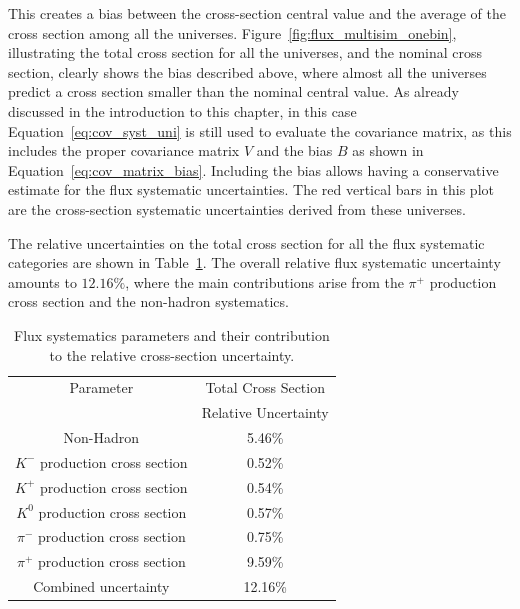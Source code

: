 This creates a bias between the cross-section central value and the average of the cross section among all the universes. Figure~\ref{fig:flux_multisim_onebin}, illustrating the total cross section for all the universes, and the nominal cross section, clearly shows the bias described above, where almost all the universes predict a cross section smaller than the nominal central value.
As already discussed in the introduction to this chapter, in this case Equation~\eqref{eq:cov_syst_uni} is still used to evaluate the covariance matrix, as this includes the proper covariance matrix $V$ and the bias $B$ as shown in Equation~\eqref{eq:cov_matrix_bias}. Including the bias allows having a conservative estimate for the flux systematic uncertainties. The red vertical bars in this plot are the cross-section systematic uncertainties derived from these universes.

The relative uncertainties on the total cross section for all the flux systematic categories are shown in Table~\ref{tab:flux_parameters}. The overall relative flux systematic uncertainty amounts to $12.16\%$, where the main contributions arise from the $\pi^+$ production cross section and the non-hadron systematics. 




\begin{table}[p]
\caption[Beam Flux Modelling Systematic Uncertainties]{Flux systematics parameters and their contribution to the relative cross-section uncertainty.}
\label{tab:flux_parameters}
\centering
\begin{tabular}{c c}
\toprule
Parameter                                                        &  Total Cross Section  \\
                                                                 &  Relative Uncertainty \\
\midrule
Non-Hadron                        &  5.46\%   \\
$K^-$ production cross section     &  0.52\%    \\
$K^+$ production cross section    &  0.54\%    \\
$K^0$ production cross section    &  0.57\%    \\
$\pi^-$ production cross section   &  0.75\%    \\
$\pi^+$ production cross section   &  9.59\%    \\
\midrule
Combined uncertainty                                           &  12.16\%    \\
\bottomrule
\end{tabular}
\end{table}

